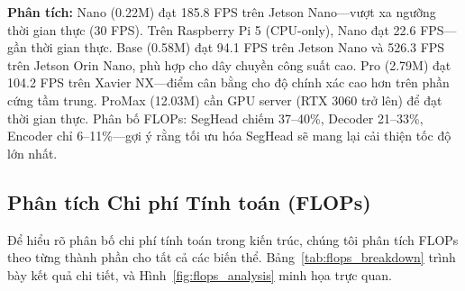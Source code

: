 \documentclass[conference]{IEEEtran}
\begin{document}
\begin{table}[t]
\centering
\caption{Độ trễ suy luận ước tính trên thiết bị biên (đầu vào $320\times320$, FP32, đơn ảnh)}
\label{tab:latency}
\end{table}

\noindent \textbf{Phân tích:} Nano (0.22M) đạt 185.8 FPS trên Jetson Nano---vượt xa ngưỡng thời gian thực (30 FPS). Trên Raspberry Pi 5 (CPU-only), Nano đạt 22.6 FPS---gần thời gian thực. Base (0.58M) đạt 94.1 FPS trên Jetson Nano và 526.3 FPS trên Jetson Orin Nano, phù hợp cho dây chuyền công suất cao. Pro (2.79M) đạt 104.2 FPS trên Xavier NX---điểm cân bằng cho độ chính xác cao hơn trên phần cứng tầm trung. ProMax (12.03M) cần GPU server (RTX 3060 trở lên) để đạt thời gian thực. Phân bố FLOPs: SegHead chiếm 37--40\%, Decoder 21--33\%, Encoder chỉ 6--11\%---gợi ý rằng tối ưu hóa SegHead sẽ mang lại cải thiện tốc độ lớn nhất.

\subsection{Phân tích Chi phí Tính toán (FLOPs)}

Để hiểu rõ phân bố chi phí tính toán trong kiến trúc, chúng tôi phân tích FLOPs theo từng thành phần cho tất cả các biến thể. Bảng~\ref{tab:flops_breakdown} trình bày kết quả chi tiết, và Hình~\ref{fig:flops_analysis} minh họa trực quan.
\end{document}
